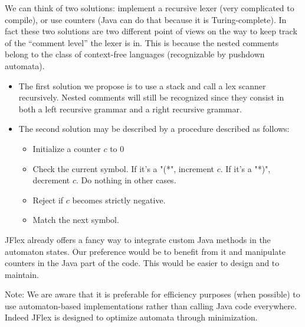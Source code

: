 \documentclass[12pt]{report}
\begin{document}
We can think of two solutions: implement a recursive lexer (very complicated to compile),
or use counters (Java can do that because it is Turing-complete).
In fact these two solutions are two different point of views on the way to keep track of the ``comment level'' the lexer
is in. This is because the nested comments belong to the class of context-free languages (recognizable by pushdown
automata).
\begin{itemize}
  \item The first solution we propose is to use a stack and call a lex scanner recursively.
    Nested comments will still be recognized since they consist in both a left recursive grammar and a right recursive
    grammar.
  \item %
    The second solution may be described by a procedure described as follows:
    \begin{itemize}
      \item{Initialize a counter $c$ to 0}
      \item{Check the current symbol. If it's a "(*", increment $c$. If it's a "*)", decrement $c$. Do nothing in other cases.}
      \item{Reject if $c$ becomes strictly negative.}
      \item{Match the next symbol.}
    \end{itemize}
\end{itemize}
JFlex already offers a fancy way to integrate custom Java methods in the automaton states. Our preference would be to
benefit from it and manipulate counters in the Java part of the code. This would be easier to design and to maintain.

Note: We are aware that it is preferable for efficiency purposes (when possible) to use automaton-based implementations
rather than calling Java code everywhere. Indeed JFlex is designed to optimize automata through minimization.  
\end{document}
